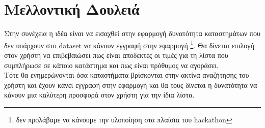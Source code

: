 \documentclass[a4paper,10pt]{report}
\begin{document}
\section{Μελλοντική Δουλειά}

Στην συνέχεια η ιδέα είναι να εισαχθεί στην εφαρμογή δυνατότητα καταστημάτων 
που δεν υπάρχουν στο dataset να κάνουν εγγραφή στην εφαρμογή \footnote{δεν προλάβαμε να 
κάνουμε την υλοποίηση στα πλαίσια του hackathon}. Θα δίνεται επιλογή στον χρήστη να 
επιβεβαιώσει πως είναι αποδεκτές οι τιμές για τη λίστα που συμπλήρωσε σε κάποιο 
κατάστημα και πως είναι πρόθυμος να αγοράσει. \\
Τότε θα ενημερώνονται όσα καταστήματα βρίσκονται στην ακτίνα αναζήτησης του χρήστη
και έχουν κάνει εγγραφή στην εφαρμογή και θα τους δίνεται η δυνατότητα να κάνουν
μια καλύτερη προσφορά στον χρήστη για την ίδια λίστα.\\
 
\end{document}
